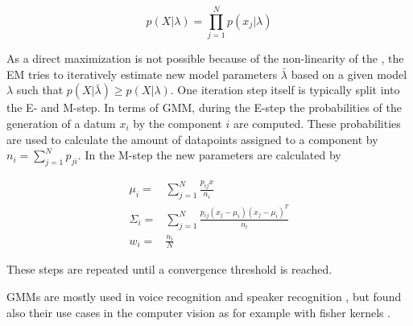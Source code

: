 \begin{equation}
\label{eqn:likelihood}
p(X|\lambda) = \prod_{j=1}^{N} p(x_j|\lambda)
\end{equation}

As a direct maximization is not possible because of the non-linearity of the , the \ac{EM} tries to iteratively estimate new model parameters $\bar{\lambda}$ based on a given model $\lambda$ such that $p(X|\bar{\lambda}) \ge p(X|\lambda)$. One iteration step itself is typically split into the E- and M-step. In terms of \ac{GMM}, during the E-step the probabilities of the generation of a datum $x_i$ by the component $i$ are computed. These probabilities are used to calculate the amount of datapoints assigned to a component by $n_i = \sum_{j=1}^N p_{ji}$. In the M-step the new parameters are calculated by

\begin{eqnarray}
\mu_i = &\sum_{j=1}^N \frac{p_{ij} x}{n_i} \\
\Sigma_i = & \sum_{j=1}^N \frac{p_{ij} (x_j - \mu_i) (x_j - \mu_i)^T}{n_i}\\
w_i  = & \frac{n_i}{N}
\end{eqnarray}

These steps are repeated until a convergence threshold is reached.

\acp{GMM} are mostly used in voice recognition and speaker recognition \cite{Reynolds1995}, but found also their use cases in the computer vision as for example with fisher kernels \cite{Perronnin2006}.